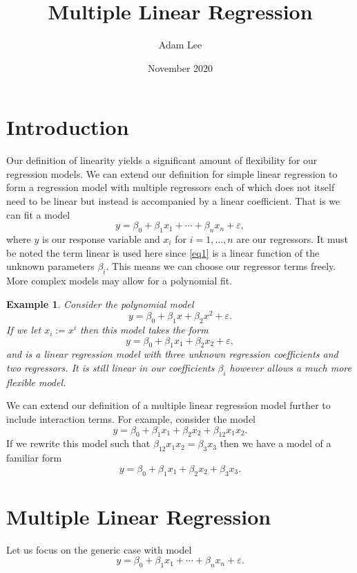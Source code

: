 \documentclass[10pt,a4paper, onecolumn, conference]{IEEEtran}
\author{Adam Lee}
\title{Multiple Linear Regression}
\date{November 2020}
\theoremstyle{own}
\newtheorem{example}{Example}
\theoremstyle{definition}
\theoremstyle{plain}
\begin{document}
\maketitle
\pagebreak
\section{Introduction}
Our definition of linearity yields a significant amount of flexibility for our regression models. We can extend our definition for simple linear regression to form a regression model with multiple regressors each of which does not itself need to be linear but instead is accompanied by a linear coefficient. That is we can fit a model
\begin{equation} \label{eq1}
y = \beta_0 + \beta_1 x_1 + \cdots + \beta_n x_n + \varepsilon,
\end{equation}
where $y$ is our response variable and $x_i$ for $i = 1, \ldots, n$ are our regressors. It must be noted the term linear is used here since \cref{eq1} is a linear function of the unknown parameters $\beta_i$. This means we can choose our regressor terms freely. More complex models may allow for a polynomial fit.
\begin{example} \label{ex1}
Consider the polynomial model
\begin{equation}
y = \beta_0 + \beta_1 x + \beta_2 x^2 + \varepsilon.
\end{equation}
If we let $x_i := x^i$ then this model takes the form
\begin{equation}
y = \beta_0 + \beta_1 x_1 + \beta_2 x_2 + \varepsilon,
\end{equation}
and is a linear regression model with three unknown regression coefficients and two regressors. It is still linear in our coefficients $\beta_i$ however allows a much more flexible model.
\end{example}

We can extend our definition of a multiple linear regression model further to include interaction terms. For example, consider the model
\begin{equation}
y = \beta_0 + \beta_1 x_1 + \beta_2 x_2 + \beta_{12} x_1 x_2.
\end{equation}
If we rewrite this model such that $\beta_{12} x_1 x_2 = \beta_3 x_3$ then we have a model of a familiar form
\[ y = \beta_0 + \beta_1 x_1 + \beta_2 x_2 + \beta_3 x_3.\]

\section{Multiple Linear Regression}
Let us focus on the generic case with model
\begin{equation}
y = \beta_0 + \beta_1 x_1 + \cdots + \beta_n x_n + \varepsilon.
\end{equation}
\end{document}

